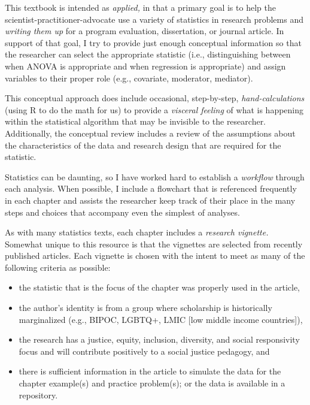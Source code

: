 \documentclass[
  11pt,
]{book}
\providecommand{\tightlist}{%
  \setlength{\itemsep}{0pt}\setlength{\parskip}{0pt}}
\begin{document}
This textbook is intended as \emph{applied,} in that a primary goal is to help the scientist-practitioner-advocate use a variety of statistics in research problems and \emph{writing them up} for a program evaluation, dissertation, or journal article. In support of that goal, I try to provide just enough conceptual information so that the researcher can select the appropriate statistic (i.e., distinguishing between when ANOVA is appropriate and when regression is appropriate) and assign variables to their proper role (e.g., covariate, moderator, mediator).

This conceptual approach does include occasional, step-by-step, \emph{hand-calculations} (using R to do the math for us) to provide a \emph{visceral feeling} of what is happening within the statistical algorithm that may be invisible to the researcher. Additionally, the conceptual review includes a review of the assumptions about the characteristics of the data and research design that are required for the statistic.

Statistics can be daunting, so I have worked hard to establish a \emph{workflow} through each analysis. When possible, I include a flowchart that is referenced frequently in each chapter and assists the researcher keep track of their place in the many steps and choices that accompany even the simplest of analyses.

As with many statistics texts, each chapter includes a \emph{research vignette.} Somewhat unique to this resource is that the vignettes are selected from recently published articles. Each vignette is chosen with the intent to meet as many of the following criteria as possible:

\begin{itemize}
\tightlist
\item
  the statistic that is the focus of the chapter was properly used in the article,
\item
  the author's identity is from a group where scholarship is historically marginalized (e.g., BIPOC, LGBTQ+, LMIC {[}low middle income countries{]}),
\item
  the research has a justice, equity, inclusion, diversity, and social responsivity focus and will contribute positively to a social justice pedagogy, and
\item
  there is sufficient information in the article to simulate the data for the chapter example(s) and practice problem(s); or the data is available in a repository.
\end{itemize}
\end{document}
